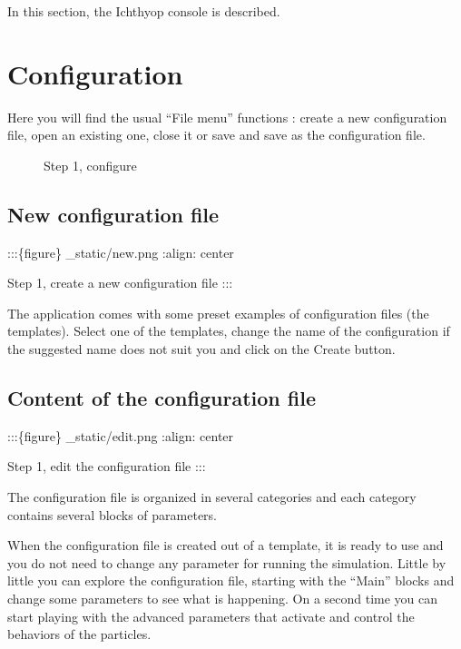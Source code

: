 \documentclass[
  letterpaper,
  DIV=11,
  numbers=noendperiod]{scrreprt}
\begin{document}
In this section, the Ichthyop console is described.

\section{Configuration}\label{configuration}

Here you will find the usual ``File menu'' functions : create a new
configuration file, open an existing one, close it or save and save as
the configuration file.

\begin{figure}


\caption{\label{fig-elephant}Step 1, configure}

\end{figure}%

\subsection{New configuration file}\label{new-configuration-file}

:::\{figure\} \_static/new.png :align: center

Step 1, create a new configuration file :::

The application comes with some preset examples of configuration files
(the templates). Select one of the templates, change the name of the
configuration if the suggested name does not suit you and click on the
Create button.

\subsection{Content of the configuration
file}\label{content-of-the-configuration-file}

:::\{figure\} \_static/edit.png :align: center

Step 1, edit the configuration file :::

The configuration file is organized in several categories and each
category contains several blocks of parameters.

When the configuration file is created out of a template, it is ready to
use and you do not need to change any parameter for running the
simulation. Little by little you can explore the configuration file,
starting with the ``Main'' blocks and change some parameters to see what
is happening. On a second time you can start playing with the advanced
parameters that activate and control the behaviors of the particles.
\end{document}
